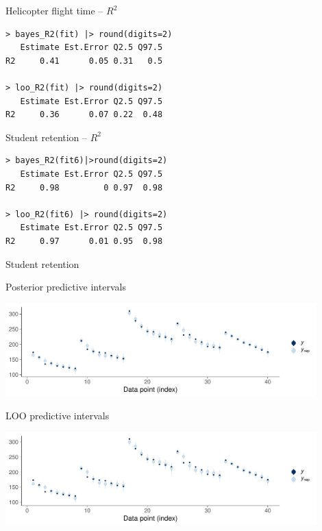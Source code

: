 \documentclass[english,t]{beamer}
\begin{document}
\begin{frame}[fragile]{Helicopter flight time -- $R^2$}

{\small
\begin{lstlisting}
> bayes_R2(fit) |> round(digits=2)
   Estimate Est.Error Q2.5 Q97.5
R2     0.41      0.05 0.31   0.5

> loo_R2(fit) |> round(digits=2)
   Estimate Est.Error Q2.5 Q97.5
R2     0.36      0.07 0.22  0.48
\end{lstlisting}}

\end{frame}

\begin{frame}[fragile]{Student retention -- $R^2$}

{\small
\begin{lstlisting}
> bayes_R2(fit6)|>round(digits=2)
   Estimate Est.Error Q2.5 Q97.5
R2     0.98         0 0.97  0.98

> loo_R2(fit6) |> round(digits=2)
   Estimate Est.Error Q2.5 Q97.5
R2     0.97      0.01 0.95  0.98
\end{lstlisting}}

\end{frame}

\begin{frame}[fragile]{Student retention}

\vspace{-0.8\baselineskip}  
Posterior predictive intervals\\  
  \hspace{-7mm}
  \begin{minipage}[t][3.6cm][t]{1.0\linewidth}
    \includegraphics[height=3.6cm]{student_retention_sbinom_ppc_intervals.pdf}
  \end{minipage}
  
\vspace{-0.5\baselineskip}  
LOO predictive intervals\\  
  \hspace{-7mm}
  \begin{minipage}[t][3.6cm][t]{1.0\linewidth}
    \includegraphics[height=3.6cm]{student_retention_sbinom_ppc_loo_intervals.pdf}
  \end{minipage}  

\end{frame}
\end{document}
